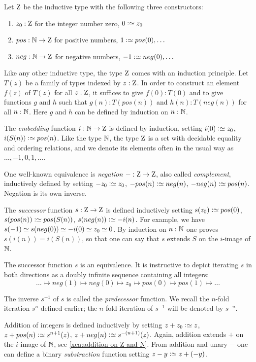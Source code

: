 \begin{definition}\label{def:zet}
  Let $\mathrm{Z}$ be the inductive type with the following three
  constructors:
\begin{enumerate}
\item $z_0: \mathrm{Z}$ for the integer number zero,
$0 \defeq z_0$
\item $pos: \mathbb{N} \to \mathrm{Z}$ for positive numbers,
$1 \defeq pos(0),\ldots$
\item $neg: \mathbb{N} \to \mathrm{Z}$ for negative numbers, 
$-1 \defeq neg(0),\ldots$
\end{enumerate}
Like any other inductive type, the type $\mathrm{Z}$ comes with an
induction principle. Let $T(z)$ be a family of types indexed by $z:\mathrm{Z}$.
In order to construct an element $f(z)$ of $T(z)$ for all $z:\mathrm{Z}$,
it suffices to give $f(0): T(0)$ and to give functions $g$ and $h$ such
that $g(n): T(pos(n))$ and $h(n): T(neg(n))$ for all $n:\mathbb{N}$.
Here $g$ and $h$ can be defined by induction on $n:\mathbb{N}$.

The \emph{embedding} function $i:\mathbb{N}\to\mathrm{Z}$ is defined by induction,
setting $i(0)\defeq z_0$, $i(S(n))\defeq pos(n)$.
Like the type $\mathbb{N}$, the type $\mathrm{Z}$ is a set with decidable equality
and ordering relations,
and we denote its elements often in the usual way as $\ldots,-1,0,1,\ldots$.

One well-known equivalence is \emph{negation} ${-}:\mathrm{Z}\to\mathrm{Z}$, 
also called \emph{complement}, inductively defined by setting 
$-z_0\defeq z_0$, 
$-pos(n)\defeq neg(n)$, 
$-neg(n)\defeq pos(n)$.
Negation is its own inverse.

The \emph{successor} function $s:\mathrm{Z}\to\mathrm{Z}$ is defined inductively setting 
$s(z_0)\defeq pos(0)$, 
$s(pos(n))\defeq pos(S(n))$,
$s(neg(n))\defeq -i(n)$. For example, we have
$s(-1)\jdeq s(neg(0))\jdeq -i(0) \jdeq z_0 \jdeq 0$.
By induction on $n:\mathbb{N}$ one proves $s(i(n))=i(S(n))$, 
so that one can say that $s$ extends $S$
on the $i$-image of $\mathbb{N}$. 

The successor function $s$ is an equivalence.
It is instructive to depict iterating $s$ in both directions as 
a doubly infinite sequence containing all integers:
\[
\ldots \mapsto neg(1) \mapsto neg(0) \mapsto z_0 \mapsto pos(0) \mapsto pos(1) \mapsto \ldots
\]

The inverse $s^{-1}$ of $s$ is called the \emph{predecessor} function.
We recall the $n$-fold iteration $s^n$ defined earlier;
the $n$-fold iteration of $s^{-1}$ will be denoted by $s^{-n}$.

Addition of integers is defined inductively by setting
$z + z_0\defeq z$, 
$z + pos(n)\defeq s^{n+1}(z)$, 
$z + neg(n)\defeq s^{-(n+1)}(z)$.
Again, addition extends $+$ on the $i$-image of $\mathbb{N}$,
see \cref{xca:addition-on-Z-and-N}. 
From addition and unary $-$ one can define a binary
\emph{substraction} function setting $z-y \defeq z+(-y)$.
\end{definition}

